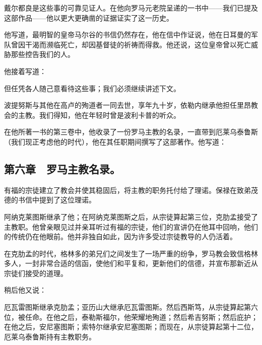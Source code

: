 戴尔都良是这些事的可靠见证人。在他向罗马元老院呈递的一书中——我们已提及这部作品——他以更大更确凿的证据证实了这一历史。\par

他写道，最明智的皇帝马尔谷的书信仍然存在，他在信中作证说，他在日耳曼的军队曾因干渴而濒临死亡，却因基督徒的祈祷而得救。他还说，这位皇帝曾以死亡威胁那些控告我们的人。\par

他接着写道：\par

 但任凭各人随己意看待这些事；我们必须继续讲述下文。\par

波提努斯与其他在高卢的殉道者一同去世，享年九十岁，依勒内继承他担任里昂教会的主教。我们得知，他在年轻时曾是波利卡普的听众。\par

在他所著一书的第三卷中，他收录了一份罗马主教的名录，一直带到厄莱乌泰鲁斯（我们现正考虑他的时代），他在其任职期间撰写了这部著作。他写道：\par


\subsection{第六章　罗马主教名录。}

有福的宗徒建立了教会并使其稳固后，将主教的职务托付给了理诺。保禄在致弟茂德的书信中提到了这位理诺。\par

阿纳克莱图斯继承了他；在阿纳克莱图斯之后，从宗徒算起第三位，克肋孟接受了主教职。他曾亲眼见过并亲耳听过有福的宗徒，他们的宣讲仍在他耳中回响，他们的传统仍在他眼前。他并非独自如此，因为许多受过宗徒教导的人仍活着。\par

在克肋孟的时代，格林多的弟兄们之间发生了一场严重的纷争，罗马教会致信格林多人，一封非常合适的信函，使他们和平复和，更新他们的信德，并宣布那新近从宗徒们接受的道理。\par

稍后他又说：\par

厄瓦雷图斯继承克肋孟；亚历山大继承厄瓦雷图斯。然后西斯笃，从宗徒算起第六位，被任命。在他之后，泰勒斯福尔，他荣耀地殉道；然后希吉努斯；然后庇护；在他之后，安尼塞图斯；索特尔继承安尼塞图斯；而现在，从宗徒算起第十二位，厄莱乌泰鲁斯持有主教职务。\par

